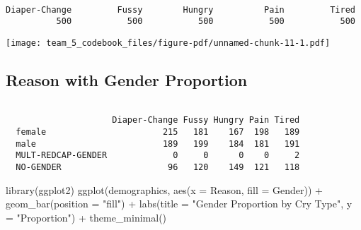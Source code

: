 \documentclass[
  letterpaper,
  DIV=11,
  numbers=noendperiod]{scrartcl}
\newenvironment{Shaded}{\begin{snugshade}}{\end{snugshade}}
\newcommand{\AttributeTok}[1]{\textcolor[rgb]{0.40,0.45,0.13}{#1}}
\newcommand{\CommentTok}[1]{\textcolor[rgb]{0.37,0.37,0.37}{#1}}
\newcommand{\FunctionTok}[1]{\textcolor[rgb]{0.28,0.35,0.67}{#1}}
\newcommand{\NormalTok}[1]{\textcolor[rgb]{0.00,0.23,0.31}{#1}}
\newcommand{\SpecialCharTok}[1]{\textcolor[rgb]{0.37,0.37,0.37}{#1}}
\newcommand{\StringTok}[1]{\textcolor[rgb]{0.13,0.47,0.30}{#1}}
\begin{document}
\begin{verbatim}

Diaper-Change         Fussy        Hungry          Pain         Tired 
          500           500           500           500           500 
\end{verbatim}

\begin{Shaded}
\end{Shaded}

\begin{center}
\texttt{[image: team\_5\_codebook\_files/figure-pdf/unnamed-chunk-11-1.pdf]}
\end{center}

\subsection{Reason with Gender
Proportion}\label{reason-with-gender-proportion}

\begin{Shaded}
\end{Shaded}

\begin{verbatim}
                    
                     Diaper-Change Fussy Hungry Pain Tired
  female                       215   181    167  198   189
  male                         189   199    184  181   191
  MULT-REDCAP-GENDER             0     0      0    0     2
  NO-GENDER                     96   120    149  121   118
\end{verbatim}

\begin{Shaded}
\begin{Highlighting}[]
\FunctionTok{library}\NormalTok{(ggplot2)}
\FunctionTok{ggplot}\NormalTok{(demographics, }\FunctionTok{aes}\NormalTok{(}\AttributeTok{x =}\NormalTok{ Reason, }\AttributeTok{fill =}\NormalTok{ Gender)) }\SpecialCharTok{+}
  \FunctionTok{geom\_bar}\NormalTok{(}\AttributeTok{position =} \StringTok{"fill"}\NormalTok{) }\SpecialCharTok{+}
  \FunctionTok{labs}\NormalTok{(}\AttributeTok{title =} \StringTok{"Gender Proportion by Cry Type"}\NormalTok{, }\AttributeTok{y =} \StringTok{"Proportion"}\NormalTok{) }\SpecialCharTok{+}
  \FunctionTok{theme\_minimal}\NormalTok{()}
\end{Highlighting}
\end{Shaded}
\end{document}
